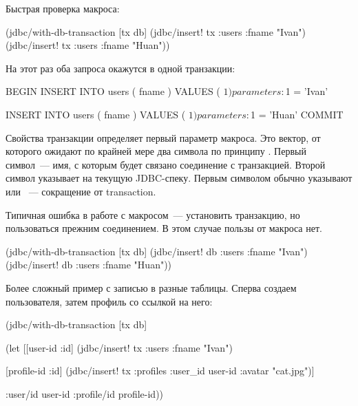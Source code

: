 Быстрая проверка макроса:

\begin{english}
  \begin{clojure}
(jdbc/with-db-transaction [tx db]
  (jdbc/insert! tx :users {:fname "Ivan"})
  (jdbc/insert! tx :users {:fname "Huan"}))
  \end{clojure}
\end{english}

На этот раз оба запроса окажутся в одной транзакции:

\begin{english}
  \begin{sql}
BEGIN
INSERT INTO users ( fname ) VALUES ( $1 )
parameters: $1 = 'Ivan'

INSERT INTO users ( fname ) VALUES ( $1 )
parameters: $1 = 'Huan'
COMMIT
  \end{sql}
\end{english}

Свойства транзакции определяет первый параметр макроса. Это вектор, от которого ожидают по крайней мере два символа по принципу . Первый символ~--- имя, с которым будет связано соединение с транзакцией. Второй символ указывает на текущую JDBC-спеку. Первым символом обычно указывают  или ~--- сокращение от transaction.

Типичная ошибка в работе с макросом~--- установить транзакцию, но пользоваться прежним соединением. В этом случае пользы от макроса нет.

\begin{english}
  \begin{clojure}
(jdbc/with-db-transaction [tx db]
  (jdbc/insert! db :users {:fname "Ivan"})
  (jdbc/insert! db :users {:fname "Huan"}))
  \end{clojure}
\end{english}

Более сложный пример с записью в разные таблицы. Сперва создаем пользователя, затем профиль со ссылкой на него:

\begin{english}
  \begin{clojure}
(jdbc/with-db-transaction [tx db]

  (let [[{user-id :id}]
        (jdbc/insert! tx :users {:fname "Ivan"})

        [{profile-id :id}]
        (jdbc/insert! tx :profiles {:user_id user-id :avatar "cat.jpg"})]

    {:user/id user-id
     :profile/id profile-id}))
  \end{clojure}
\end{english}

